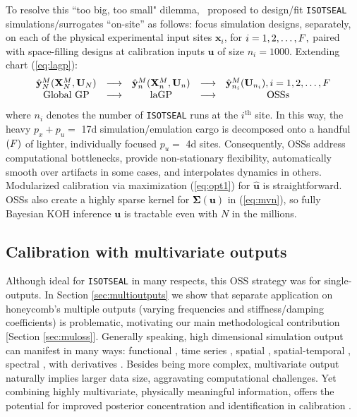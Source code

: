 \documentclass[12pt]{article}
\newcommand{\blunew}[1]{\textcolor{black}{#1}} %
\begin{document}
To resolve this ``too big, too small" dilemma, \citeauthor{Huang:2018}~proposed to design/fit  {\tt ISOTSEAL} simulations/surrogates ``on-site'' as
follows: focus simulation designs, separately, on each of the physical
experimental input sites $\mathbf{x}_i$, for $i = 1, 2, \dots, \blunew{F},$ paired
with space-filling designs at calibration inputs $\mathbf{u}$ of size $n_i =
1000$. Extending chart (\ref{eq:lagp})\blunew{:}
 \begin{align}
 \begin{array}{ccccc}
\blunew{ \hat{\mathbf{y}}^M_{N}(\mathbf{X}^M_{N}, \mathbf{U}_{N})}  &
\longrightarrow  &
 \blunew{\hat{\mathbf{y}}^M_{n}  (\mathbf{X}^M_{n}, \mathbf{U}_{n})}  &
\longrightarrow & 
 \hat{\mathbf{y}}^M_{n_i}(\mathbf{U}_{n_i}),  i = 1, 2, \dots, \blunew{F} \\
 \text{Global GP} &
\longrightarrow  &
\text{laGP}  &
\longrightarrow & 
\text{OSSs} 
 \end{array}
\label{eq:oss}
\end{align} 
where $n_i$ denotes the number of {\tt ISOTSEAL} runs at the $i^\mathrm{th}$
site. In this way, the heavy $p_x + p_u =$ 17d simulation/emulation cargo is
decomposed onto a handful $(\blunew{F})$ of lighter, individually focused
$p_u=$ 4d sites.  Consequently,  OSSs address computational bottlenecks,
provide non-stationary flexibility, automatically smooth over artifacts in
some cases, and interpolates dynamics in others. Modularized calibration via
maximization (\ref{eq:opt1}) for $\hat{\mathbf{u}}$ is straightforward.   OSSs
also create a highly sparse kernel for \blunew{$\mathbf{\Sigma}(\mathbf{u})$}
in (\ref{eq:mvn}), so fully Bayesian KOH inference $\mathbf{u}$ is tractable
even with \blunew{$N$} in the millions.



\subsection{Calibration with multivariate outputs}

Although ideal for  {\tt ISOTSEAL} in many respects, this OSS strategy was for single-outputs.  In Section \ref{sec:multioutputs} we show that
separate application on honeycomb's multiple outputs (varying frequencies and
stiffness/damping coefficients) is problematic, motivating our main methodological
contribution [Section \ref{sec:muloss}].  Generally speaking, high dimensional
simulation output can manifest in many ways: functional \citep{Bayarri2007b,
Higdon2008}, time series \citep{conti2010, fadikar2018}, spatial
\citep{Bayarri2009},  spatial-temporal \citep{Gu2016}, spectral
\citep{Guinness2019}, with derivatives \citep{mcfarland2008calibration}.
Besides being more complex, multivariate output naturally implies
larger data size, aggravating computational challenges. Yet combining highly
multivariate, physically meaningful information, offers the potential for
improved posterior concentration and identification in calibration
\citep[see, e.g.][]{Arendt2012, Jiang2016}.
\end{document}
